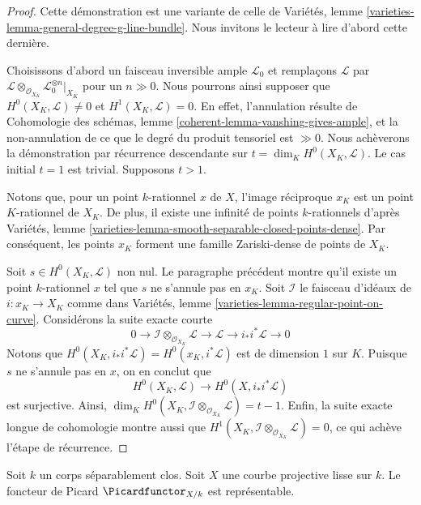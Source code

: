\begin{proof}
Cette démonstration est une variante de celle de
Variétés, lemme \ref{varieties-lemma-general-degree-g-line-bundle}.
Nous invitons le lecteur à lire d'abord cette dernière.

\medskip\noindent
Choisissons d'abord un faisceau inversible ample $\mathcal{L}_0$ et
remplaçons $\mathcal{L}$ par
$\mathcal{L} \otimes_{\mathcal{O}_{X_K}} \mathcal{L}_0^{\otimes n}|_{X_K}$
pour un $n \gg 0$. Nous pourrons ainsi supposer que
$H^0(X_K, \mathcal{L}) \not = 0$ et $H^1(X_K, \mathcal{L}) = 0$.
En effet, l'annulation résulte de Cohomologie des schémas, lemme
\ref{coherent-lemma-vanshing-gives-ample}, et la non-annulation de ce que
le degré du produit tensoriel est $\gg 0$.
Nous achèverons la démonstration par récurrence descendante sur
$t = \dim_K H^0(X_K, \mathcal{L})$. Le cas initial $t = 1$ est trivial.
Supposons $t > 1$.

\medskip\noindent
Notons que, pour un point $k$-rationnel $x$ de $X$, l'image réciproque $x_K$
est un point $K$-rationnel de $X_K$. De plus, il existe une infinité de
points $k$-rationnels d'après Variétés, lemme
\ref{varieties-lemma-smooth-separable-closed-points-dense}. Par conséquent,
les points $x_K$ forment une famille Zariski-dense de points de $X_K$.

\medskip\noindent
Soit $s \in H^0(X_K, \mathcal{L})$ non nul. Le paragraphe précédent
montre qu'il existe un point $k$-rationnel
$x$ tel que $s$ ne s'annule pas en $x_K$. Soit $\mathcal{I}$
le faisceau d'idéaux de $i : x_K \to X_K$ comme dans
Variétés, lemme \ref{varieties-lemma-regular-point-on-curve}. Considérons la
suite exacte courte
$$
0 \to \mathcal{I} \otimes_{\mathcal{O}_{X_K}} \mathcal{L} \to
\mathcal{L} \to i_*i^*\mathcal{L} \to 0
$$
Notons que $H^0(X_K, i_*i^*\mathcal{L}) = H^0(x_K, i^*\mathcal{L})$
est de dimension $1$ sur $K$. Puisque $s$ ne s'annule pas en $x$, on en conclut que
$$
H^0(X_K, \mathcal{L}) \longrightarrow H^0(X, i_*i^*\mathcal{L})
$$
est surjective. Ainsi,
$\dim_K H^0(X_K, \mathcal{I} \otimes_{\mathcal{O}_{X_K}} \mathcal{L}) = t - 1$.
Enfin, la suite exacte longue de cohomologie montre aussi que
$H^1(X_K, \mathcal{I} \otimes_{\mathcal{O}_{X_K}} \mathcal{L}) = 0$,
ce qui achève l'étape de récurrence.
\end{proof}

\begin{proposition}
\label{proposition-pic-curve}
Soit $k$ un corps séparablement clos. Soit $X$ une courbe projective lisse
sur $k$. Le foncteur de Picard $\Picardfunctor_{X/k}$ est représentable.
\end{proposition}

